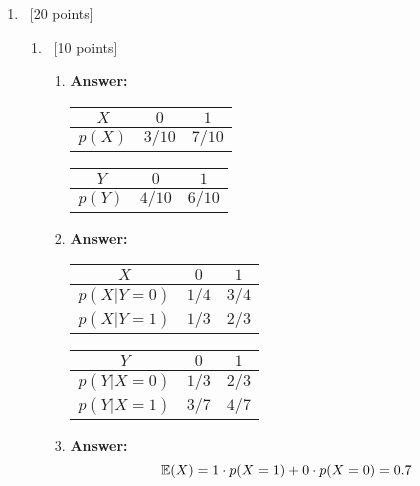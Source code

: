 \documentclass[12pt, fullpage,letterpaper]{article}
\begin{document}
\begin{enumerate}
\item~[20 points]
        \begin{enumerate}
            \item~[10 points] 
            \begin{enumerate}
            \item
            \textbf{Answer:}
            \begin{table}[h]
            \centering
            \begin{tabular}{ccc}
            \hline\hline
            $X$ & $0$ & $1$ \\ \hline
            $p(X)$ & $3/10$ & $7/10$ \\ \hline\hline
            \end{tabular}
            \hspace{10pt}
            \begin{tabular}{ccc}
            \hline\hline
            $Y$ & $0$ & $1$ \\ \hline
            $p(Y)$ & $4/10$ & $6/10$ \\ \hline\hline
            \end{tabular}
            \end{table}    
            \item
            \textbf{Answer:}
            \begin{table}[h]
            \centering
            \begin{tabular}{ccc}
            \hline\hline
            $X$ & $0$ & $1$ \\ \hline
            $p(X|Y=0)$ & $1/4$ & $3/4$ \\ \hline
            $p(X|Y=1)$ & $1/3$ & $2/3$ \\ \hline\hline
            \end{tabular}
            \hspace{10pt}
            \begin{tabular}{ccc}
            \hline\hline
            $Y$ & $0$ & $1$ \\ \hline
            $p(Y|X=0)$ & $1/3$ & $2/3$ \\ \hline
            $p(Y|X=1)$ & $3/7$ & $4/7$ \\ \hline\hline
            \end{tabular}
            \end{table}
            \item
            \textbf{Answer:}
            \[
            \mathbb{E}(X) = 1 \cdot p(X=1) + 0 \cdot p(X=0) = 0.7
            \]
            \[
\]
\end{enumerate}
\end{enumerate}
\end{enumerate}
\end{document}
